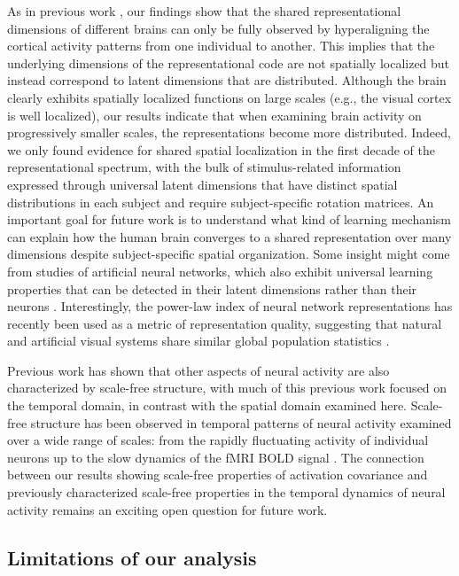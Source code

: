 \documentclass[10pt]{article}
\begin{document}
As in previous work \autocite{Haxby2011}, our findings show that the shared representational dimensions of different brains can only be fully observed by hyperaligning the cortical activity patterns from one individual to another. This implies that the underlying dimensions of the representational code are not spatially localized but instead correspond to latent dimensions that are distributed. Although the brain clearly exhibits spatially localized functions on large scales (e.g., the visual cortex is well localized), our results indicate that when examining brain activity on progressively smaller scales, the representations become more distributed. Indeed, we only found evidence for shared spatial localization in the first decade of the representational spectrum, with the bulk of stimulus-related information expressed through universal latent dimensions that have distinct spatial distributions in each subject and require subject-specific rotation matrices. An important goal for future work is to understand what kind of learning mechanism can explain how the human brain converges to a shared representation over many dimensions despite subject-specific spatial organization. Some insight might come from studies of artificial neural networks, which also exhibit universal learning properties that can be detected in their latent dimensions rather than their neurons \autocites[e.g.][]{Guth2024,Chen2024}. Interestingly, the power-law index of neural network representations has recently been used as a metric of representation quality, suggesting that natural and artificial visual systems share similar global population statistics \autocite{Agrawal2022}.

Previous work has shown that other aspects of neural activity are also characterized by scale-free structure, with much of this previous work focused on the temporal domain, in contrast with the spatial domain examined here. Scale-free structure has been observed in temporal patterns of neural activity examined over a wide range of scales: from the rapidly fluctuating activity of individual neurons up to the slow dynamics of the fMRI BOLD signal \autocite{He2010,Werner2010,Ciuciu2012,Boonstra2013,He2014}. The connection between our results showing scale-free properties of activation covariance and previously characterized scale-free properties in the temporal dynamics of neural activity remains an exciting open question for future work.

\subsection{Limitations of our analysis}\label{limitations-of-our-analysis}
\end{document}
